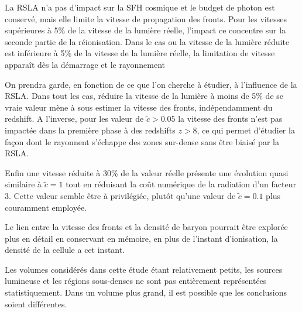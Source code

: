 La \ac{RSLA} n'a pas d'impact sur la \ac{SFH} cosmique et le budget de photon est conservé, mais elle limite la vitesse de propagation des fronts.
Pour les vitesses supérieures à 5\% de la vitesse de la lumière réelle, l'impact ce concentre sur la seconde partie de la réionisation.
Dans le cas ou la vitesse de la lumière réduite est inférieure à 5\% de la vitesse de la lumière réelle, la limitation de vitesse apparaît dès la démarrage et le rayonnement 

On prendra garde, en fonction de ce que l'on cherche à étudier, à l'influence de la \ac{RSLA}.
Dans tout les cas, réduire la vitesse de la lumière à moins de 5\% de se vraie valeur mène à sous estimer la vitesse des fronts, indépendamment du redshift.
A l'inverse, pour les valeur de $\tilde{c} > 0.05$ la vitesse des fronts n'est pas impactée dans la première phase à des redshifts $z>8$, ce qui permet d'étudier la façon dont le rayonnent s’échappe des zones sur-dense sans être biaisé par la \ac{RSLA}.

Enfin une vitesse réduite à 30\% de la valeur réelle présente une évolution quasi similaire à $\tilde{c}=1$ tout en réduisant la coût numérique de la radiation d'un facteur 3.
Cette valeur semble être à privilégiée, plutôt qu'une valeur de $\tilde{c}=0.1$ plus couramment employée.

Le lien entre la vitesse des fronts et la densité de baryon pourrait être explorée plus en détail en conservant en mémoire, en plus de l'instant d'ionisation, la densité de la cellule a cet instant.

Les volumes considérés dans cette étude étant relativement petits, les sources lumineuse et les régions sous-denses ne sont pas entièrement représentées statistiquement.
Dans un volume plus grand, il est possible que les conclusions soient différentes.




%
%



